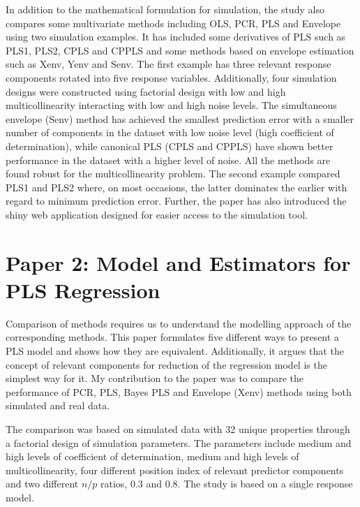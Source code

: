 \documentclass[11pt,twoside,openright,titlepage,
  headinclude,footinclude,BCOR=5mm,
  numbers=noenddot,cleardoublepage=empty,
  tablecaptionabove, dottedtoc,
  bibliography=totoc,paper=a4]{scrreprt}
\begin{document}
In addition to the mathematical formulation for simulation, the study also compares some multivariate methods including OLS, PCR, PLS and Envelope using two simulation examples. It has included some derivatives of PLS such as PLS1, PLS2, CPLS and CPPLS and some methods based on envelope estimation such as Xenv, Yenv and Senv. The first example has three relevant response components rotated into five response variables. Additionally, four simulation designs were constructed using factorial design with low and high multicollinearity interacting with low and high noise levels. The simultaneous envelope (Senv) method has achieved the smallest prediction error with a smaller number of components in the dataset with low noise level (high coefficient of determination), while canonical PLS (CPLS and CPPLS) have shown better performance in the dataset with a higher level of noise. All the methods are found robust for the multicollinearity problem. The second example compared PLS1 and PLS2 where, on most occasions, the latter dominates the earlier with regard to minimum prediction error. Further, the paper has also introduced the shiny \citep{shiny} web application designed for easier access to the simulation tool.

\hypertarget{paper-2-model-and-estimators-for-pls-regression}{%
\section{Paper 2: Model and Estimators for PLS Regression}\label{paper-2-model-and-estimators-for-pls-regression}}

Comparison of methods requires us to understand the modelling approach of the corresponding methods. This paper formulates five different ways to present a PLS model \citep{helland1990partial} and shows how they are equivalent. Additionally, it argues that the concept of relevant components for reduction of the regression model is the simplest way for it. My contribution to the paper was to compare the performance of PCR, PLS, Bayes PLS and Envelope (Xenv) methods using both simulated and real data.

The comparison was based on simulated data with 32 unique properties through a factorial design of simulation parameters. The parameters include medium and high levels of coefficient of determination, medium and high levels of multicollinearity, four different position index of relevant predictor components and two different \(n/p\) ratios, 0.3 and 0.8. The study is based on a single response model.
\end{document}
